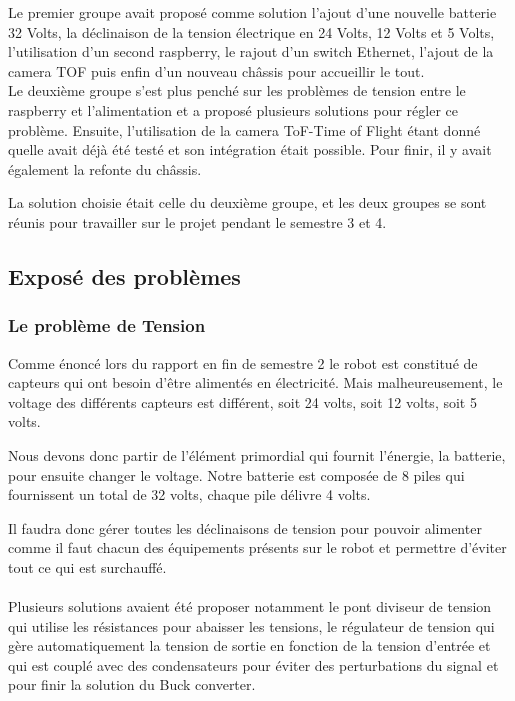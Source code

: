 \documentclass{PackagerQualityN}
\begin{document}
Le premier groupe avait proposé comme solution l’ajout d’une nouvelle batterie 32 Volts, la déclinaison de la tension électrique en 24 Volts, 12 Volts et 5 Volts, l’utilisation d’un second raspberry, le rajout d’un switch Ethernet, l'ajout de la camera TOF puis enfin d’un nouveau châssis pour accueillir le tout.\\

Le deuxième groupe s’est plus penché sur les problèmes de tension entre le raspberry et l’alimentation et a proposé plusieurs solutions pour régler ce problème. Ensuite, l’utilisation de la camera ToF-Time of Flight étant donné quelle avait déjà été testé et son intégration était possible. Pour finir, il y avait également la refonte du châssis. 

La solution choisie était celle du deuxième groupe, et les deux groupes se sont réunis pour travailler sur le projet pendant le semestre 3 et 4.

\subsection{Exposé des problèmes}

\subsubsection{Le problème de Tension}
Comme énoncé lors du rapport en fin de semestre 2 le robot est constitué de capteurs qui ont besoin d’être alimentés en électricité. Mais malheureusement, le voltage des différents capteurs est différent, soit 24 volts, soit 12 volts, soit 5 volts.

Nous devons donc partir de l’élément primordial qui fournit l’énergie, la batterie, pour ensuite changer le voltage. Notre batterie est composée de 8 piles qui fournissent un total de 32 volts, chaque pile délivre 4 volts.

Il faudra donc gérer toutes les déclinaisons de tension pour pouvoir alimenter comme il faut chacun des équipements présents sur le robot et permettre d'éviter tout ce qui est surchauffé.\\
\\
Plusieurs solutions avaient été proposer notamment le pont diviseur de tension qui utilise les résistances pour abaisser les tensions, le régulateur de tension qui gère automatiquement la tension de sortie en fonction de la tension d’entrée et qui est couplé avec des condensateurs pour éviter des perturbations du signal et pour finir la solution du Buck converter.
\end{document}
